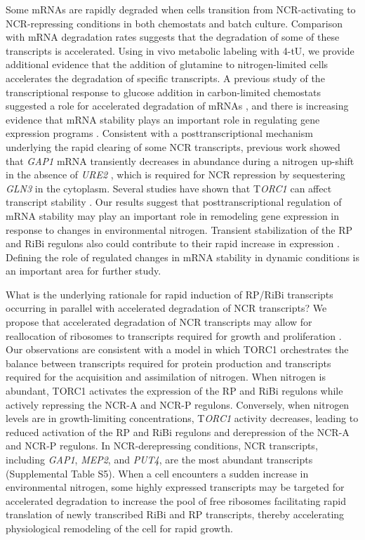 Some mRNAs are rapidly degraded when cells
transition from NCR-activating to NCR-repressing conditions in both
chemostats and batch culture. Comparison with mRNA degradation rates
suggests that the degradation of some of these transcripts is
accelerated. Using in vivo metabolic labeling with 4-tU, we provide
additional evidence that the addition of glutamine to nitrogen-limited
cells accelerates the degradation of specific transcripts. A previous
study of the transcriptional response to glucose addition in
carbon-limited chemostats suggested a role for accelerated degradation
of mRNAs 
\parencite{kresnowati2006}
, and there is increasing evidence
that mRNA stability plays an important role in regulating gene
expression programs 
\parencite{puig2005coordinate,bennett2008metabolic,baumgartner2011antagonistic}. 
Consistent with a posttranscriptional
mechanism underlying the rapid clearing of some NCR transcripts,
previous work showed that \textit{GAP1} mRNA transiently decreases in abundance
during a nitrogen up-shift in the absence of \textit{URE2} 
\parencite{ter1998repression}, 
which is required for NCR repression by sequestering \textit{GLN3} in
the cytoplasm. Several studies have shown that T\textit{ORC1} can affect
transcript stability 
\parencite{albig2001target,munchel2011dynamic}.
Our results suggest that posttranscriptional regulation of mRNA
stability may play an important role in remodeling gene expression in
response to changes in environmental nitrogen. Transient stabilization
of the RP and RiBi regulons also could contribute to their rapid
increase in expression 
\parencite{yin2003glucose}. Defining the role of
regulated changes in mRNA stability in dynamic conditions is an
important area for further study. 

What is the underlying rationale
for rapid induction of RP/RiBi transcripts occurring in parallel with
accelerated degradation of NCR transcripts? We propose that
accelerated degradation of NCR transcripts may allow for reallocation
of ribosomes to transcripts required for growth and proliferation
\parencite{kief1981coordinate,lee2011dynamic}. Our observations are
consistent with a model in which TORC1 orchestrates the balance
between transcripts required for protein production and transcripts
required for the acquisition and assimilation of nitrogen. When
nitrogen is abundant, TORC1 activates the expression of the RP and
RiBi regulons while actively repressing the NCR-A and NCR-P regulons.
Conversely, when nitrogen levels are in growth-limiting
concentrations, T\textit{ORC1} activity decreases, leading to reduced
activation of the RP and RiBi regulons and derepression of the NCR-A
and NCR-P regulons. In NCR-derepressing conditions, NCR transcripts,
including \textit{GAP1}, \textit{MEP2}, and \textit{PUT4}, 
are the most abundant transcripts
(Supplemental Table S5). When a cell encounters a sudden increase in
environmental nitrogen, some highly expressed transcripts may be
targeted for accelerated degradation to increase the pool of free
ribosomes facilitating rapid translation of newly transcribed RiBi and
RP transcripts, thereby accelerating physiological remodeling of the
cell for rapid growth.  

